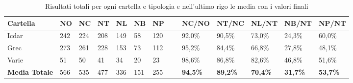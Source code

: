 		\begin{table}\label{tab:totale}
	\begin{center}
	\begin{tabular}{|l|l|l|l|l|l|l|l|l|l|l|l|l|} \hline
	Cartella & NO & NC & NT & NL & NB & NP & ~ & NC/NO & NT/NC & NL/NT & NB/NT & NP/NT \\ \hline
	Icdar & 242 & 224 & 208 & 149 & 58 & 120 & ~ & 92,0\% & 90,5\% & 73,0\% & 24,3\% & 60,0\%\\ 
	Grec & 273 & 261 & 228 & 153 & 73 & 112 & ~ & 95,2\% & 84,4\% & 66,8\% & 27,8\% & 48,1\%\\
	Varie & 51 & 50 & 41 & 34 & 20 & 23 & ~ & 98,6\% & 86,8\% & 82,6\% & 46,8\% & 51,6\%\\ \hline
	\textbf{Media Totale} & 566 &	535	 & 477 &	336 &	151 & 	255 & ~ & \textbf{94,5\%} & \textbf{89,2\%} &	\textbf{70,4\%} & \textbf{31,7\%} & \textbf{53,7\%} \\ \hline

	\end{tabular}
	\tiny{\caption{Risultati totali per ogni cartella e tipologia e nell'ultimo rigo le media con i valori finali}}
	\end{center}
	\end{table}
	

